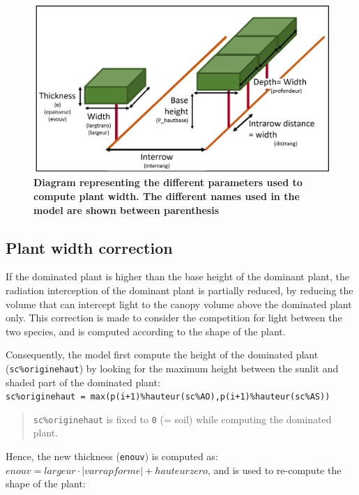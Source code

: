 \documentclass[]{book}
\begin{document}
\begin{figure}
\centering
\includegraphics{img/Light-interception-dominant-1.png}
\caption{\label{fig:Width}\textbf{Diagram representing the different parameters used to compute plant width. The different names used in the model are shown between parenthesis}}
\end{figure}

\hypertarget{plant-width-correction}{%
\subsection{Plant width correction}\label{plant-width-correction}}

If the dominated plant is higher than the base height of the dominant plant, the radiation interception of the dominant plant is partially reduced, by reducing the volume that can intercept light to the canopy volume above the dominated plant only. This correction is made to consider the competition for light between the two species, and is computed according to the shape of the plant.

Consequently, the model first compute the height of the dominated plant (\texttt{sc\%originehaut}) by looking for the maximum height between the sunlit and shaded part of the dominated plant:\\
\texttt{sc\%originehaut\ =\ max(p(i+1)\%hauteur(sc\%AO),p(i+1)\%hauteur(sc\%AS))}

\begin{quote}
\texttt{sc\%originehaut} is fixed to \texttt{0} (= soil) while computing the dominated plant.
\end{quote}

Hence, the new thickness (\texttt{enouv}) is computed as: \(enouv=largeur\cdot\left|varrapforme\right|+hauteurzero\), and is used to re-compute the shape of the plant:
\end{document}
